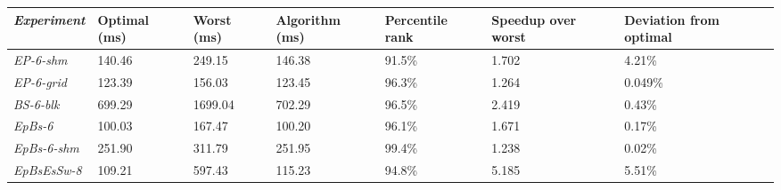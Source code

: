 \documentclass[twocolumn]{el-author}
\begin{document}
  \begin{table}[t]
	\centering
	{\begin{tabular}{@{}l@{}|p{0.65cm}|p{0.65cm}|p{0.85cm}|p{1.0cm}@{}|p{1.1cm}@{}|p{1.3cm}@{}}
		\hline 
		\emph{Experiment} & Optimal (ms) & Worst (ms) & Algorithm (ms) & Percentile rank & Speedup over worst & Deviation from optimal \\
		\hline
		\emph{EP-6-shm} & 140.46 & 249.15 & 146.38 & 91.5\% & 1.702 & 4.21\% \\
		\hline
		\emph{EP-6-grid} & 123.39 & 156.03 & 123.45 & 96.3\% & 1.264 & 0.049\%\\
		\hline
		\emph{BS-6-blk} & 699.29 & 1699.04 & 702.29 & 96.5\% & 2.419 & 0.43\%\\
		\hline
		\emph{EpBs-6} & 100.03 & 167.47 & 100.20 & 96.1\% & 1.671 & 0.17\%\\
		\hline
		\emph{EpBs-6-shm} & 251.90 & 311.79 & 251.95 & 99.4\% & 1.238 & 0.02\%\\
		\hline
		\emph{EpBsEsSw-8} & 109.21& 597.43 & 115.23 & 94.8\% & 5.185 & 5.51\%\\
		\hline
	\end{tabular}}{}
\end{table} 
\end{document}
